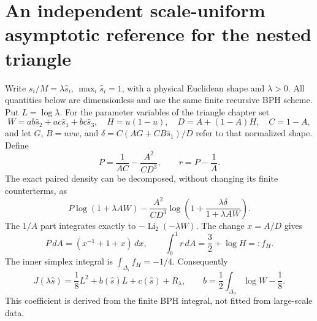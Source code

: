 \section{An independent scale-uniform asymptotic reference for the nested triangle}

Write $s_i/M=\lambda\widehat s_i$, $\max_i\widehat s_i=1$, with a
physical Euclidean shape and $\lambda>0$. All quantities below are
dimensionless and use the same finite recursive BPH scheme. Put $L=\log
\lambda$. For the parameter variables of the triangle chapter set
\[
 W=ab\widehat s_2+ac\widehat s_1+bc\widehat s_3,\quad
 H=u(1-u),\quad D=A+(1-A)H,\quad C=1-A,
\]
and let $G$, $B=uvw$, and $\delta=C(AG+CB\widehat s_1)/D$ refer to that
normalized shape. Define
\[
 P=\frac{1}{AC}-\frac{A^2}{CD^3},\qquad r=P-\frac1A.
\]
The exact paired density can be decomposed, without changing its finite
counterterms, as
\[
 P\log(1+\lambda AW)
 -\frac{A^2}{CD^3}
       \log\left(1+\frac{\lambda\delta}{1+\lambda AW}\right).
\]
The $1/A$ part integrates exactly to $-\operatorname{Li}_2(-\lambda W)$.
The change $x=A/D$ gives
\[
 P\,dA=(x^{-1}+1+x)\,dx,\qquad
 \int_0^1r\,dA=\frac32+\log H=:f_H.
\]
The inner simplex integral is $\int_{\Delta_i}f_H=-1/4$. Consequently
\[
 J(\lambda\widehat s)=\frac18L^2+b(\widehat s)L+c(\widehat s)
                      +R_\lambda,
 \qquad b=\frac12\int_{\Delta_o}\log W-\frac18.
\]
This coefficient is derived from the finite BPH integral, not fitted from
large-scale data.

